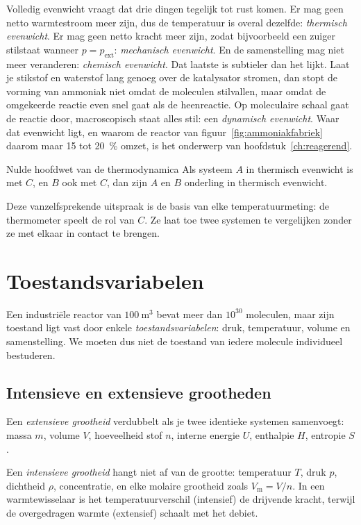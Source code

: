 Volledig evenwicht vraagt dat drie dingen tegelijk tot rust komen. Er mag geen netto warmtestroom meer zijn, dus de temperatuur is overal dezelfde: \emph{thermisch evenwicht}. Er mag geen netto kracht meer zijn, zodat bijvoorbeeld een zuiger stilstaat wanneer $p = p_\text{ext}$: \emph{mechanisch evenwicht}. En de samenstelling mag niet meer veranderen: \emph{chemisch evenwicht}. Dat laatste is subtieler dan het lijkt. Laat je stikstof en waterstof lang genoeg over de katalysator stromen, dan stopt de vorming van ammoniak niet omdat de moleculen stilvallen, maar omdat de omgekeerde reactie  even snel gaat als de heenreactie. Op moleculaire schaal gaat de reactie door, macroscopisch staat alles stil: een \emph{dynamisch evenwicht}. Waar dat evenwicht ligt, en waarom de reactor van figuur~\ref{fig:ammoniakfabriek} daarom maar 15 tot \SI{20}{\percent} omzet, is het onderwerp van hoofdstuk~\ref{ch:reagerend}.

\begin{definitie}{Nulde hoofdwet van de thermodynamica}
Als systeem $A$ in thermisch evenwicht is met $C$, en $B$ ook met $C$, dan zijn $A$ en $B$ onderling in thermisch evenwicht.
\end{definitie}

Deze vanzelfsprekende uitspraak is de basis van elke temperatuurmeting: de thermometer speelt de rol van $C$. Ze laat toe twee systemen te vergelijken zonder ze met elkaar in contact te brengen.

\section{Toestandsvariabelen}

Een industri\"ele reactor van $100~\mathrm{m^3}$ bevat meer dan $10^{30}$ moleculen, maar zijn toestand ligt vast door enkele \emph{toestandsvariabelen}: druk, temperatuur, volume en samenstelling. We moeten dus niet de toestand van iedere molecule individueel bestuderen.

\subsection{Intensieve en extensieve grootheden}

Een \emph{extensieve grootheid} verdubbelt als je twee identieke systemen samenvoegt: massa $m$, volume $V$, hoeveelheid stof $n$, interne energie $U$, enthalpie $H$, entropie $S$. 

Een \emph{intensieve grootheid} hangt niet af van de grootte: temperatuur $T$, druk $p$, dichtheid $\rho$, concentratie, en elke molaire grootheid zoals $V_\mathrm{m} = V/n$. In een warmtewisselaar is het temperatuurverschil (intensief) de drijvende kracht, terwijl de overgedragen warmte (extensief) schaalt met het debiet.

